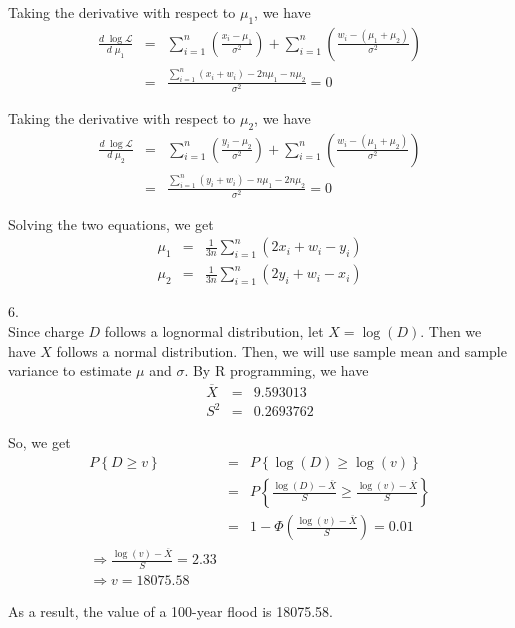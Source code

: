 \documentclass[12pt]{article}
\begin{document}
Taking the derivative with respect to $\mu_1$, we have
\begin{eqnarray*}
  \frac {d \; \log {\mathcal{L}}}{d \; \mu_1}
  &=& \sum_{i=1}^n \left( \frac{x_i - \mu_1}{\sigma^2} \right) + 
  \sum_{i=1}^n \left( \frac{w_i - (\mu_1+\mu_2)}{\sigma^2} \right) \\
  &=& \frac {\sum_{i=1}^n (x_i + w_i) - 2n \mu_1 - n \mu_2}{\sigma^2} = 0
\end{eqnarray*}

Taking the derivative with respect to $\mu_2$, we have
\begin{eqnarray*}
  \frac {d \; \log {\mathcal{L}}}{d \; \mu_2}
  &=& \sum_{i=1}^n \left( \frac{y_i - \mu_2}{\sigma^2} \right) + 
  \sum_{i=1}^n \left( \frac{w_i - (\mu_1+\mu_2)}{\sigma^2} \right) \\
  &=& \frac {\sum_{i=1}^n (y_i + w_i) - n \mu_1 - 2n \mu_2}{\sigma^2} = 0
\end{eqnarray*}

Solving the two equations, we get
\begin{eqnarray*}
  \mu_1 &=& \frac {1}{3n} \sum_{i=1}^n (2x_i + w_i - y_i) \\
  \mu_2 &=& \frac {1}{3n} \sum_{i=1}^n (2y_i + w_i - x_i)
\end{eqnarray*}

6. \\
Since charge $D$ follows a lognormal distribution, let $X = \log (D)$. Then we have $X$ follows a normal distribution. Then, we will use sample mean and sample variance to estimate $\mu$ and $\sigma$. By R programming, we have
\begin{eqnarray*}
  \overline{X} &=& 9.593013 \\
  S^2 &=& 0.2693762
\end{eqnarray*}

So, we get
\begin{eqnarray*}
  P \left\{ D \ge v \right\}
  &=& P \left\{ \log (D) \ge \log (v) \right\} \\
  &=& P \left\{ \frac {\log (D) - \overline{X}}{S}
    \ge \frac {\log (v) - \overline{X}}{S} \right\} \\
  &=& 1 - \Phi \left( \frac {\log (v) - \overline{X}}{S} \right) = 0.01 \\
  \Rightarrow \frac {\log (v) - \overline{X}}{S} = 2.33 \\
  \Rightarrow v = 18075.58
\end{eqnarray*}

As a result, the value of a 100-year flood is 18075.58. \\
\end{document}
